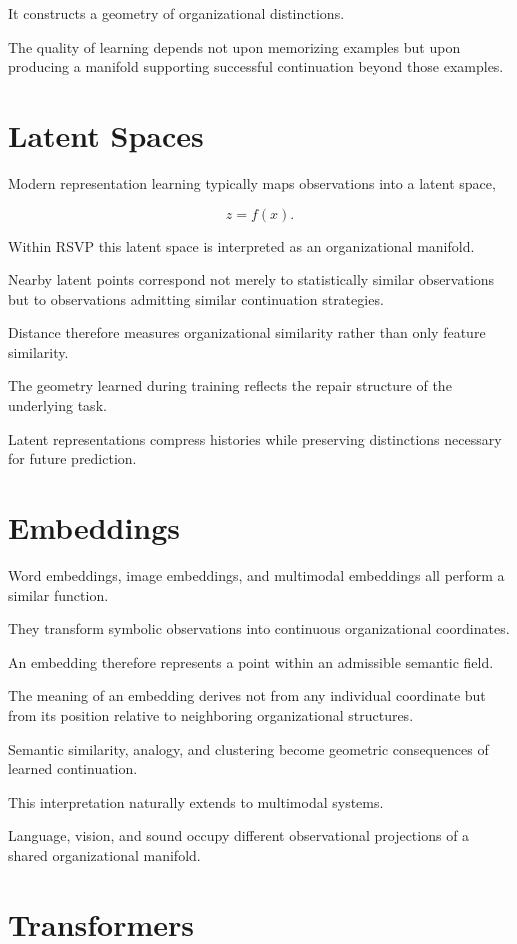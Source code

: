 \documentclass[11pt,oneside]{book}
\numberwithin{equation}{chapter}
\theoremstyle{definition}
\theoremstyle{plain}
\begin{document}
It constructs a geometry of organizational distinctions.

The quality of learning depends not upon memorizing examples but upon
producing a manifold supporting successful continuation beyond those
examples.

\section{Latent Spaces}

Modern representation learning typically maps observations into a latent
space,

\[
z
=
f(x).
\]

Within RSVP this latent space is interpreted as an organizational manifold.

Nearby latent points correspond not merely to statistically similar
observations but to observations admitting similar continuation strategies.

Distance therefore measures organizational similarity rather than only
feature similarity.

The geometry learned during training reflects the repair structure of the
underlying task.

Latent representations compress histories while preserving distinctions
necessary for future prediction.

\section{Embeddings}

Word embeddings, image embeddings, and multimodal embeddings all perform a
similar function.

They transform symbolic observations into continuous organizational
coordinates.

An embedding therefore represents a point within an admissible semantic
field.

The meaning of an embedding derives not from any individual coordinate but
from its position relative to neighboring organizational structures.

Semantic similarity, analogy, and clustering become geometric consequences
of learned continuation.

This interpretation naturally extends to multimodal systems.

Language, vision, and sound occupy different observational projections of a
shared organizational manifold.

\section{Transformers}
\end{document}
